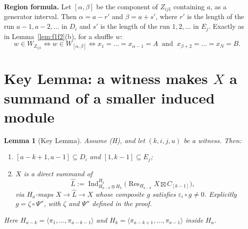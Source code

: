 \documentclass[11pt]{amsart}
\newcommand{\Ind}{\operatorname{Ind}}
\newcommand{\Res}{\operatorname{Res}}
\newcommand{\sq}{\boxtimes}
\theoremstyle{plain}
\newtheorem{lemmaII}{Lemma}
\theoremstyle{definition}
\begin{document}
\noindent\textbf{Region formula.} Let $[\alpha,\beta]$ be the component of $Z_{ij1}$ containing $a$, as a generator interval. Then $\alpha=a-r'$ and $\beta=a+s'$, where $r'$ is the length of the run $a-1,a-2,\dots$ in $D_i$ and $s'$ is the length of the run $1,2,\dots$ in $E_j$. Exactly as in Lemma~\ref{lem:f1f2}(b), for a shuffle $w$:
\[
w\in W_{Z_{ij1}}\iff w\in W_{[\alpha,\beta]}\iff x_1=\dots=x_{\alpha-1}=A\ \text{ and }\ x_{\beta+2}=\dots=x_N=B.
\]

\section{Key Lemma: a witness makes \texorpdfstring{$X$}{X} a summand of a smaller induced module}

\begin{lemmaII}[Key Lemma]\label{II:key}
Assume (H), and let $(k,i,j,u)$ be a witness. Then:
\begin{enumerate}[label=\textup{(\alph*)},itemsep=1pt]
\item $[a-k+1,a-1]\subseteq D_i$ and $[1,k-1]\subseteq E_j$;
\item $X$ is a direct summand of
\[
\widehat L:=\Ind_{H_{a-k}\otimes H_k}^{H_a}\bigl(\Res_{H_{a-k}}X\sq C_{[k-1]}\bigr),
\]
via $H_a$-maps $X\to\widehat L\to X$ whose composite $g$ satisfies $\varepsilon_i\circ g\ne0$. Explicitly $g=\zeta\circ\Psi''$, with $\zeta$ and $\Psi''$ defined in the proof.
\end{enumerate}
Here $H_{a-k}=\langle\pi_1,\dots,\pi_{a-k-1}\rangle$ and $H_k=\langle\pi_{a-k+1},\dots,\pi_{a-1}\rangle$ inside $H_a$.
\end{lemmaII}
\end{document}
